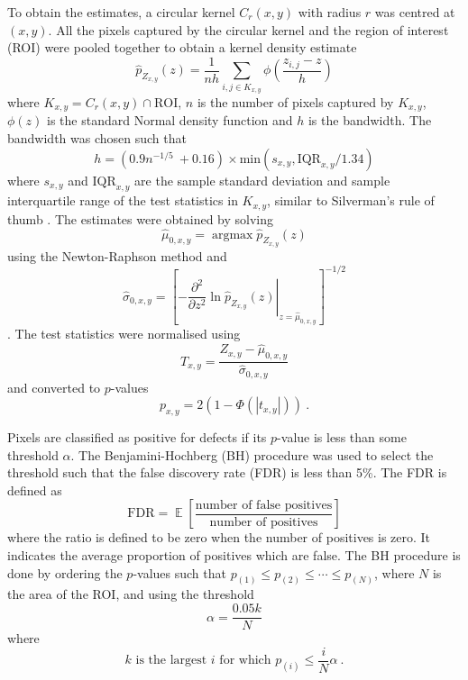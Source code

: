 \documentclass{article}
\DeclareMathOperator*{\argmax}{argmax}
\DeclareMathOperator{\expectation}{\mathbb{E}}
\begin{document}
To obtain the estimates, a circular kernel $C_r(x,y)$ with radius $r$ was centred at $(x,y)$. All the pixels captured by the circular kernel and the region of interest (ROI) were pooled together to obtain a kernel density estimate \citep{friedman2001elements, parzen1962on}
\begin{equation}
\widehat{p}_{Z_{x,y}}(z) = 
\frac{1}{nh}
  \sum_{i,j\in K_{x,y}}\phi\left(
    \dfrac{z_{i,j}-z}{h}
  \right)
\end{equation}
where $K_{x,y} = C_r(x,y) \cap \text{ROI}$, $n$ is the number of pixels captured by $K_{x,y}$, $\phi(z)$ is the standard Normal density function and $h$ is the bandwidth. The bandwidth was chosen such that
\begin{equation}
  h = (0.9n^{-1/5}\ + 0.16) \times \text{min}\left(s_{x,y},\text{IQR}_{x,y}/1.34\right)
  \label{eq:inference_ourruleofthumb}
\end{equation}
where $s_{x,y}$ and $\text{IQR}_{x,y}$ are the sample standard deviation and sample interquartile range of the test statistics in $K_{x,y}$, similar to Silverman's rule of thumb \citep{sheather2004density, silverman1986density}. The estimates were obtained by solving
\begin{equation}
\widehat\mu_{0,x,y} = \argmax\widehat{p}_{Z_{x,y}}(z)
\end{equation}
using the Newton-Raphson method and
\begin{equation}
  \widehat{\sigma}_{0,x,y} = \left[
    \left.
      -\dfrac{\partial^2}{\partial z^2}\ln\widehat{p}_{Z_{x,y}}(z)
    \right|_{z=\widehat{\mu}_{0,x,y}}
  \right]^{-1/2}
\end{equation}
\citep{efron2004large}. The test statistics were normalised using
\begin{equation}
  T_{x,y} = 
  \dfrac{
    Z_{x,y}-\widehat{\mu}_{0,x,y}
  }
  {
    \widehat{\sigma}_{0,x,y}
  }
\end{equation}
and converted to $p$-values
\begin{equation}
  p_{x,y} = 2(1-\Phi(|t_{x,y}|)) \ .
\end{equation}

Pixels are classified as positive for defects if its $p$-value is less than some threshold $\alpha$. The Benjamini-Hochberg (BH) \citep{benjamini1995controlling} procedure was used to select the threshold such that the false discovery rate (FDR) is less than 5\%. The FDR is defined as
\begin{equation}
\text{FDR}=\expectation\left[\dfrac{\text{number of false positives}}{\text{number of positives}}\right]
\end{equation}
where the ratio is defined to be zero when the number of positives is zero. It indicates the average proportion of positives which are false. The BH procedure is done by ordering the $p$-values such that $p_{(1)}\leqslant p_{(2)}\leqslant \cdots \leqslant p_{(N)}$, where $N$ is the area of the ROI, and using the threshold
\begin{equation}
  \alpha = \frac{0.05 k}{N}
\end{equation}
where
\begin{equation}
  k\text{ is the largest }i\text{ for which }p_{(i)}\leqslant\frac{i}{N}\alpha
  \ .
\end{equation}
\end{document}
